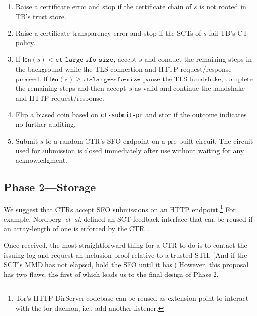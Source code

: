 \begin{enumerate}
    \item Raise a certificate error and stop if the certificate chain of $s$
        is not rooted in TB's trust store.
    \item Raise a certificate transparency error and stop if the SCTs of $s$
        fail TB's CT policy.
    \item If $\mathsf{len}(s) < \texttt{ct-large-sfo-size}$, accept $s$ and
        conduct the remaining steps in the background while the TLS connection
        and HTTP request/response proceed. If $\mathsf{len}(s) \geq \texttt{ct-large-sfo-size}$ pause the TLS handshake, complete the remaining steps and then
        accept~$s$ as valid and continue the handshake and HTTP request/response.
    \item Flip a biased coin based on \texttt{ct-submit-pr} and stop if the
        outcome indicates no further auditing.
    \item Submit $s$ to a random CTR's SFO-endpoint on a pre-built circuit.
        The circuit used for submission is closed immediately after use without
        waiting for any acknowledgment.
\end{enumerate}

\subsection{Phase 2---Storage} \label{sec:base:phase2}

We suggest that CTRs accept SFO submissions on an HTTP endpoint.\footnote{%
    Tor's HTTP DirServer codebase can be reused as extension point to interact
    with the tor daemon, i.e., add another listener.
} For example, Nordberg~\emph{et~al.} defined an SCT feedback interface that can
be reused if an array-length of one is enforced by the CTR~\cite{nordberg}.

Once received, the most straightforward thing for a CTR to do is to contact the
issuing log and request an inclusion proof relative to a trusted STH. (And if the
SCT's MMD has not elapsed, hold the SFO until it has.) However, this proposal has
two flaws, the first of which leads us to the final design of Phase 2.

